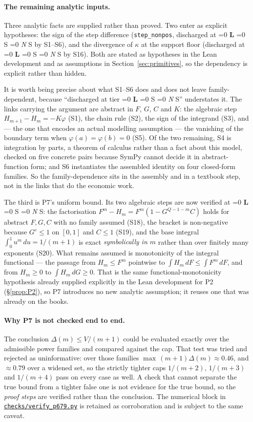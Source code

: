 \documentclass[11pt]{article}
\newcommand{\file}[1]{\href{run:#1}{\texttt{#1}}}
\newcommand{\tier}[1]{%
  \ifnum\pdfstrcmp{#1}{L}=0 \textbf{L}%
  \else\ifnum\pdfstrcmp{#1}{S}=0 S%
  \else\ifnum\pdfstrcmp{#1}{N}=0 \emph{N}%
  \else #1\fi\fi\fi}
\begin{document}
\paragraph{The remaining analytic inputs.} Three analytic facts are supplied
rather than proved. Two enter as explicit hypotheses: the sign of the step
difference (\texttt{step\_nonpos}, discharged at \tier{S} by S1--S6), and the
divergence of $\kappa$ at the support floor (discharged at \tier{S} by S16).
Both are stated as hypotheses in the Lean development and as assumptions in
Section~\ref{sec:primitives}, so the dependency is explicit rather than
hidden.

It is worth being precise about what S1--S6 does and does not leave
family-dependent, because ``discharged at tier \tier{S}'' understates it. The
links carrying the argument are abstract in $F$, $G$, $C$ and $K$: the
algebraic step $H_{m+1}-H_m=-K\varphi$ (S1), the chain rule (S2), the sign of
the integrand (S3), and --- the one that encodes an actual modelling
assumption --- the vanishing of the boundary term when
$\varphi(a)=\varphi(b)=0$ (S5). Of the two remaining, S4 is integration by
parts, a theorem of calculus rather than a fact about this model, checked on
five concrete pairs because SymPy cannot decide it in abstract-function form;
and S6 instantiates the assembled identity on four closed-form families. So
the family-dependence sits in the assembly and in a textbook step, not in the
links that do the economic work.

The third is P7's uniform bound. Its two algebraic steps are now verified at
\tier{S}: the factorisation $F^m-H_m=F^m(1-G^{Q-1-m}C)$ holds for abstract
$F,G,C$ with no family assumed (S18), the bracket is non-negative because
$G^{e}\le1$ on $[0,1]$ and $C\le1$ (S19), and the base integral
$\int_0^1u^m\,du=1/(m{+}1)$ is exact \emph{symbolically in $m$} rather than
over finitely many exponents (S20). What remains assumed is monotonicity of
the integral functional --- the passage from $H_m\le F^m$ pointwise to
$\int H_m\,dF\le\int F^m\,dF$, and from $H_m\ge0$ to $\int H_m\,dG\ge0$.
That is the same functional-monotonicity hypothesis already supplied
explicitly in the Lean development for P2 (\S\ref{prop:P2}), so P7 introduces
no new analytic assumption; it reuses one that was already on the books.

\paragraph{Why P7 is not checked end to end.} The conclusion
$\Delta(m)\le V/(m{+}1)$ could be evaluated exactly over the admissible power
families and compared against the cap. That test was tried and rejected as
uninformative: over those families $\max\,(m{+}1)\Delta(m)\approx0.46$, and
$\approx0.79$ over a widened set, so the strictly tighter caps $1/(m{+}2)$,
$1/(m{+}3)$ and $1/(m{+}4)$ pass on every case as well. A check that cannot
separate the true bound from a tighter false one is not evidence for the true
bound, so the \emph{proof steps} are verified rather than the conclusion. The
numerical block in \file{checks/verify\_p679.py} is retained as corroboration
and is subject to the same caveat.
\end{document}
